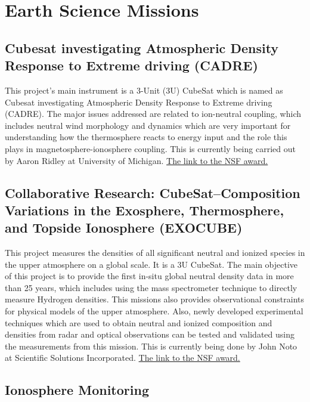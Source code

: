 \section{Earth Science Missions}

\subsection{Cubesat investigating Atmospheric Density Response to Extreme driving (CADRE)}
This project's  main instrument is a 3-Unit (3U) CubeSat which is named as Cubesat investigating Atmospheric Density Response to Extreme driving (CADRE). The major issues addressed are related to ion-neutral coupling, which includes neutral wind morphology and dynamics which are very important for understanding how the thermosphere reacts to energy input and the role this plays in magnetosphere-ionosphere coupling. This is currently being carried out by Aaron Ridley at University of Michigan. \href{http://nsf.gov/awardsearch/showAward?AWD_ID=1042815&HistoricalAwards=false}{The link to the NSF award.}

\subsection{Collaborative Research: CubeSat--Composition Variations in the Exosphere, Thermosphere, and Topside Ionosphere (EXOCUBE)}

This project measures the densities of all significant neutral and ionized species in the upper atmosphere on a global scale. It is a 3U CubeSat. The main objective of this project is to provide the first in-situ global neutral density data in more than 25 years, which includes using the mass spectrometer technique to directly measure Hydrogen densities. This missions also provides observational constraints for physical models of the upper atmosphere. Also, newly developed experimental techniques which are used to obtain neutral and ionized composition and densities from radar and optical observations can be tested and validated using the measurements from this mission. This is currently being done by John Noto at Scientific Solutions Incorporated. \href{http://nsf.gov/awardsearch/showAward?AWD_ID=1042837&HistoricalAwards=false}{The link to the NSF award.}



\subsection{Ionosphere Monitoring}

